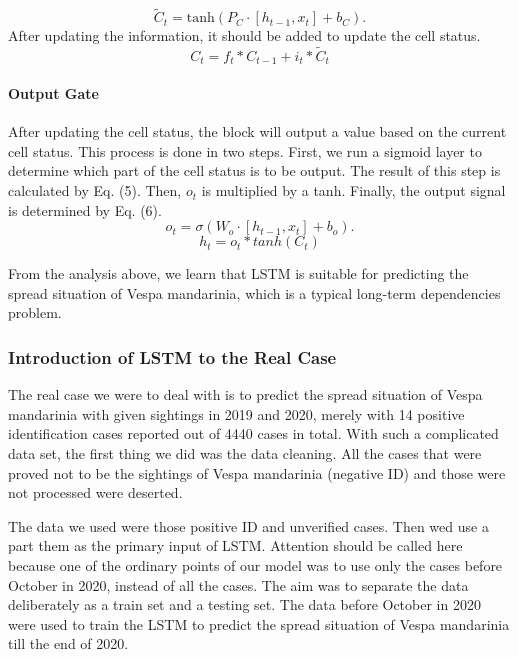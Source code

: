 \documentclass{mcmthesis}
\begin{document}
\begin{equation}
	\tilde C_{t}=\text{tanh}(P_{C}\cdot [h_{t-1}, x_{t}]+b_{C}).
\end{equation}
After updating the information, it should be added to update the cell status.
\begin{equation}
	C_{t}=f_{t}*C_{t-1}+i_{t}*\tilde C_{t}
\end{equation}
\paragraph{Output Gate}
After updating the cell status, the block will output a value based on the current cell status. This process is done in two steps. First, we run a sigmoid layer to determine which part of the cell status is to be output. The result of this step is calculated by Eq. (5). Then, $o_{t}$ is multiplied by a tanh. Finally, the output signal is determined by Eq. (6).
 \begin{equation}
	o_{t}=\sigma(W_{o}\cdot [h_{t-1}, x_{t}]+b_{o}).
\end{equation}
\begin{equation}
	h_{t}=o_{t}*tanh(C_{t})
\end{equation}

From the analysis above, we learn that LSTM is suitable for predicting the spread situation of Vespa mandarinia, which is a typical long-term dependencies problem.

\subsubsection{Introduction of LSTM to the Real Case} 
The real case we were to deal with is to predict the spread situation of Vespa mandarinia with given sightings in 2019 and 2020, merely with 14 positive identification cases reported out of 4440 cases in total. With such a complicated data set, the first thing we did was the data cleaning. All the cases that were proved not to be the sightings of Vespa mandarinia (negative ID) and those were not processed were deserted. 

The data we used were those positive ID and unverified cases. Then wed use a part them as the primary input of LSTM. Attention should be called here because one of the ordinary points of our model was to use only the cases before October in 2020, instead of all the cases. The aim was to separate the data  deliberately as a train set and a testing set. The data before October in 2020 were used to train the LSTM to predict the spread situation of Vespa mandarinia till the end of 2020. 
\end{document}
